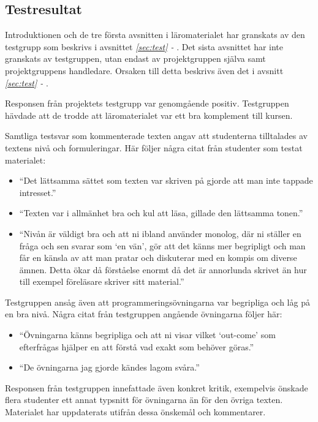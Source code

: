 \documentclass[12pt,a4paper,twoside,openright]{article}
\begin{document}
\subsection{Testresultat}
\label{sec:testResultat}
Introduktionen och de tre första avsnitten i läromaterialet har
granskats av den testgrupp som beskrivs i avsnittet \textit{\ref{sec:test} - }. Det sista avsnittet har inte granskats av
testgruppen, utan endast av projektgruppen själva samt projektgruppens
handledare. Orsaken till detta beskrivs även det i avsnitt \textit{\ref{sec:test}
  - }.

Responsen från projektets testgrupp var genomgående
positiv. Testgruppen hävdade att de trodde att läromaterialet var ett
bra komplement till kursen.

Samtliga testsvar som kommenterade texten angav att studenterna
tilltalades av textens nivå och formuleringar. Här följer några citat
från studenter som testat materialet:
\begin{itemize}
\item ``Det lättsamma sättet som texten var skriven på gjorde att man
 inte tappade intresset.''
\item ``Texten var i allmänhet bra och kul att läsa, gillade den
 lättsamma tonen.''
\item ``Nivån är väldigt bra och att ni ibland använder monolog, där
 ni ställer en fråga och sen svarar som `en vän', gör att det känns
 mer begripligt och man får en känsla av att man pratar och
 diskuterar med en kompis om diverse ämnen. Detta ökar då förståelse
 enormt då det är annorlunda skrivet än hur till exempel föreläsare
 skriver sitt material.''
\end{itemize}

Testgruppen ansåg även att programmeringsövningarna var begripliga och
låg på en bra nivå. Några citat från testgruppen angående övningarna
följer här:
\begin{itemize}
\item ``Övningarna känns begripliga och att ni visar vilket `out-come'
 som efterfrågas hjälper en att förstå vad exakt som behöver göras.''
\item ``De övningarna jag gjorde kändes lagom svåra.''
\end{itemize}

Responsen från testgruppen innefattade även konkret kritik, exempelvis
önskade flera studenter ett annat typsnitt för övningarna än för den
övriga texten. Materialet har uppdaterats utifrån dessa önskemål och
kommentarer.
\end{document}
